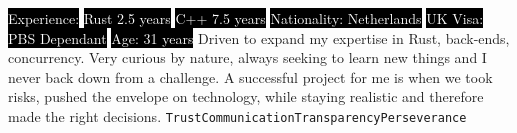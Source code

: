 \documentclass[9pt]{developercv} %
\begin{document}
\begin{minipage}[t]{0.2\textwidth} %
	\vspace{0.5em} %
    \setlength{\fboxsep}{0pt}%
    \setlength{\fboxrule}{1pt}%
\end{minipage}
\hspace{3.5em}
\begin{minipage}[t]{0.7\textwidth} %
	\vspace{0.5em} %

	
    \colorbox{black}{\textcolor{white}{Experience:}}
    \colorbox{black}{\textcolor{white}{Rust 2.5 years}}
    \colorbox{black}{\textcolor{white}{C++ 7.5 years}}
    \newline{}
    \colorbox{black}{\textcolor{white}{Nationality: Netherlands}}
    \colorbox{black}{\textcolor{white}{UK Visa: PBS Dependant}}
    \newline{}
    \colorbox{black}{\textcolor{white}{Age: 31 years}}
    \newline{}
    \newline{}
     Driven to expand my expertise in Rust, back-ends, concurrency. Very curious by nature, always seeking to learn new things and I never back down from a challenge.\newline{}
    A successful project for me is when we took risks, pushed the envelope on technology, while staying realistic and therefore made the right decisions.
    \newline{}
    \texttt{Trust}\slashsep\texttt{Communication}\slashsep\texttt{Transparency}\slashsep\texttt{Perseverance}
\end{minipage}
\end{document}
